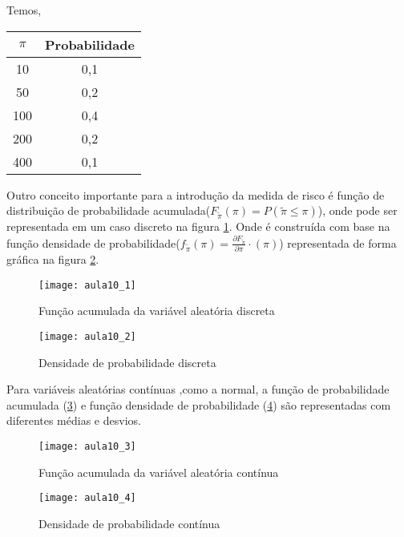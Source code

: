 Temos,

\begin{tabular}{|c|c|}
\hline 
$\pi$ & Probabilidade\tabularnewline
\hline 
\hline 
10 & 0,1\tabularnewline
\hline 
50 & 0,2\tabularnewline
\hline 
100 & 0,4\tabularnewline
\hline 
200 & 0,2\tabularnewline
\hline 
400 & 0,1\tabularnewline
\hline 
\end{tabular}

 Outro conceito importante para a introdução da medida de risco é função de distribuição de probabilidade acumulada($F_{\tilde{\pi}}(\pi)=P(\tilde{\pi}\leq\pi)$), onde pode ser representada em um caso discreto na figura \ref{fig:aula10_1}. Onde é construída com base na função densidade de probabilidade($f_{\tilde{\pi}}(\pi)=\frac{\partial F_{\tilde{\pi}}}{\partial\pi}\cdot(\pi)$) representada de forma gráfica na figura \ref{fig:aula10_2}.

\begin{figure}[H]
\begin{centering}
\texttt{[image: aula10\_1]}\protect\caption{\label{fig:aula10_1} Função acumulada da variável aleatória discreta}
\end{centering}
\end{figure}

\begin{figure}[H]
\begin{centering}
\texttt{[image: aula10\_2]}\protect\caption{\label{fig:aula10_2} Densidade de probabilidade discreta}
\end{centering}
\end{figure}

 Para variáveis aleatórias contínuas ,como a normal, a função de probabilidade acumulada (\ref{fig:aula10_3}) e função densidade de probabilidade (\ref{fig:aula10_4}) são representadas com diferentes médias e desvios.
\begin{figure}[H]
\begin{centering}
\texttt{[image: aula10\_3]}\protect\caption{\label{fig:aula10_3} Função acumulada da variável aleatória contínua}
\end{centering}
\end{figure}

\begin{figure}[H]
\begin{centering}
\texttt{[image: aula10\_4]}\protect\caption{\label{fig:aula10_4} Densidade de probabilidade contínua}
\end{centering}
\end{figure}

